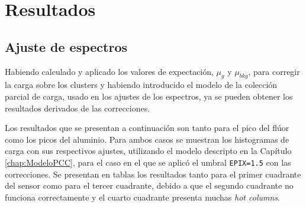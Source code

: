 \chapter{Resultados \label{chap:Resultados}}
\section{Ajuste de espectros}
\noindent Habiendo calculado y aplicado los valores de expectación, $\mu_{g}$ y $\mu_{bkg}$, para corregir la carga sobre los clusters y habiendo introducido el modelo de la colección parcial de carga, usado en los ajustes de los espectros, ya se pueden obtener los resultados derivados de las correcciones.

Los resultados que se presentan a continuación son tanto para el pico del flúor como los picos del aluminio. Para ambos casos se muestran los histogramas de carga con sus respectivos ajustes, utilizando el modelo descripto en la Capítulo \ref{chap:ModeloPCC}, para el caso en el que se aplicó el umbral \verb|EPIX=1.5| con las correcciones. Se presentan en tablas los resultados tanto para el primer cuadrante del sensor como para el tercer cuadrante, debido a que el segundo cuadrante no funciona correctamente y el cuarto cuadrante presenta muchas \textit{hot columns}.



